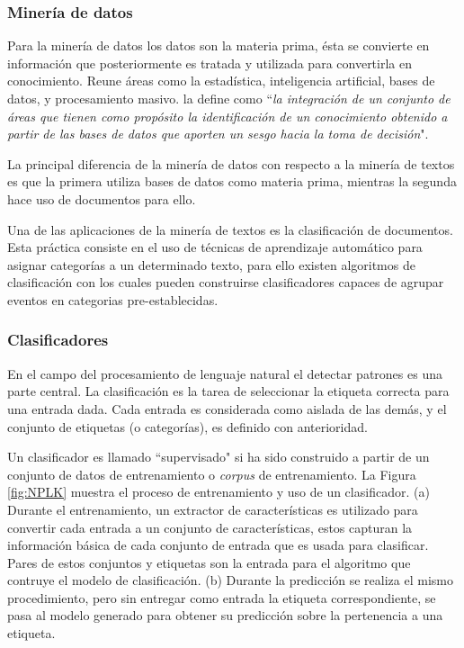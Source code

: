 \subsubsection*{Minería de datos}
\label{subsubsec:dataMining}

Para la minería de datos los datos son la materia prima, ésta se convierte en información que posteriormente es tratada y utilizada para convertirla en conocimiento. Reune áreas como la estadística, inteligencia artificial, bases de datos, y procesamiento masivo. \cite{LuisMolina} la define como ``\textit{la integración de un conjunto de áreas que tienen como propósito la identificación de un conocimiento obtenido a partir de las bases de datos que aporten un sesgo hacia la toma de decisión}".

La principal diferencia de la minería de datos con respecto a la minería de textos es que la primera utiliza bases de datos como materia prima, mientras la segunda hace uso de documentos para ello.

Una de las aplicaciones de la minería de textos es la clasificación de documentos. Esta práctica consiste en el uso de técnicas de aprendizaje automático para asignar categorías a un determinado texto, para ello existen algoritmos de clasificación con los cuales pueden construirse clasificadores capaces de agrupar eventos en categorias pre-establecidas.

\subsubsection*{Clasificadores}
\label{subsubsec:Classifiers}

En el campo del procesamiento de lenguaje natural el detectar patrones es una parte central. La clasificación es la tarea de seleccionar la etiqueta correcta para una entrada dada. Cada entrada es considerada como aislada de las demás, y el conjunto de etiquetas (o categorías), es definido con anterioridad.

Un clasificador es llamado ``supervisado" si ha sido construido a partir de un conjunto de datos de entrenamiento o \textit{corpus} de entrenamiento. La Figura \ref{fig:NPLK} muestra el proceso de entrenamiento y uso de un clasificador. (a) Durante el entrenamiento, un extractor de características es utilizado para convertir cada entrada a un conjunto de características, estos capturan la información básica de cada conjunto de entrada que es usada para clasificar. Pares de estos conjuntos y etiquetas son la entrada para el algoritmo que contruye el modelo de clasificación. (b) Durante la predicción se realiza el mismo procedimiento, pero sin entregar como entrada la etiqueta correspondiente, se pasa al modelo generado para obtener su predicción sobre la pertenencia a una etiqueta.

